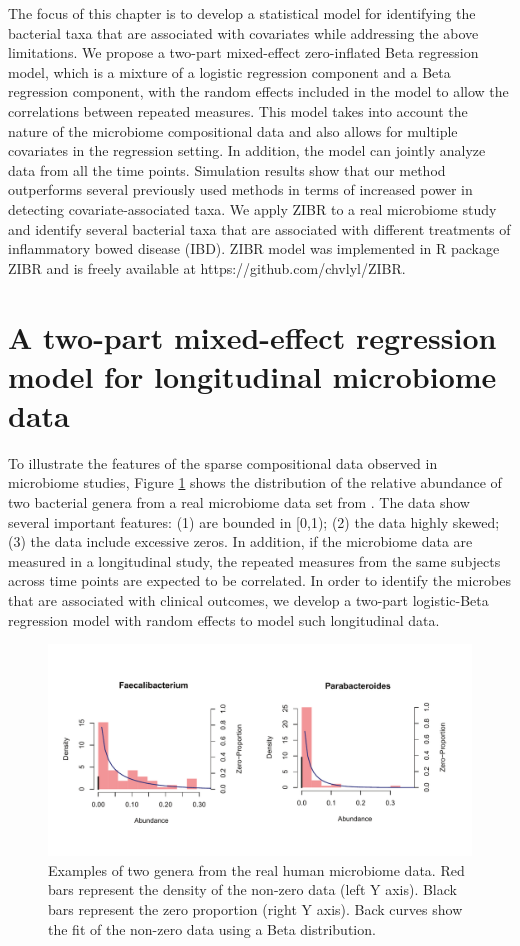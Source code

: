 The focus of this chapter is to develop a statistical model for identifying the bacterial taxa that are associated with covariates while addressing the above limitations. We propose a two-part mixed-effect zero-inflated Beta regression model, which is a mixture of a logistic regression component and a Beta regression component, with the random effects included in the model to allow the correlations between repeated measures. This model takes into account the nature of the microbiome compositional data and also allows for multiple covariates in the regression setting. In addition, the model can jointly analyze data from all the time points. Simulation results show that our method outperforms several previously used methods in terms of increased power in detecting covariate-associated taxa. We apply ZIBR to a real microbiome study and identify several bacterial taxa that are associated with different treatments of inflammatory bowed disease (IBD). ZIBR model was implemented in R package ZIBR and is freely available at https://github.com/chvlyl/ZIBR.


\section{A two-part mixed-effect regression model for longitudinal microbiome data}
To illustrate the features of the sparse compositional data observed  in microbiome studies, Figure \ref{Fig1} shows the distribution of the relative abundance of two bacterial genera from a real microbiome data set from \citet{lewis2015inflammation}.  The data show several important features: (1)  are  bounded in [0,1);  (2) the data highly skewed; (3) the data include  excessive zeros.   In addition, if the microbiome data are measured in a longitudinal study, the repeated measures from the same subjects across time points are expected to be correlated.  In order to identify the microbes that are associated with clinical outcomes, we develop a two-part logistic-Beta regression model with random effects to model such longitudinal data. 

\begin{figure}[!tpb]%
\centerline{\includegraphics[scale=0.7,trim=0 40 0 0,clip]{Figure/F41_Distribution_of_Real_Data_v3.pdf}}
\caption[Examples of two genera from the real human microbiome data]{Examples of two genera from the real human microbiome data. Red bars represent the density of the non-zero data (left Y axis). Black bars represent the zero proportion (right Y axis). Back curves show  the fit of the non-zero data using a  Beta distribution.}
\label{Fig1}
\end{figure}

